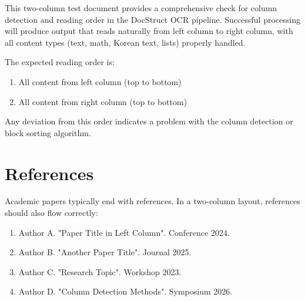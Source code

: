 \documentclass[10pt,twocolumn]{article}
\begin{document}
This two-column test document provides a comprehensive check for column detection and reading order in the DocStruct OCR pipeline. Successful processing will produce output that reads naturally from left column to right column, with all content types (text, math, Korean text, lists) properly handled.

The expected reading order is:
\begin{enumerate}
\item All content from left column (top to bottom)
\item All content from right column (top to bottom)
\end{enumerate}

Any deviation from this order indicates a problem with the column detection or block sorting algorithm.

\section{References}

Academic papers typically end with references. In a two-column layout, references should also flow correctly:

\begin{enumerate}
\item[{[1]}] Author A. "Paper Title in Left Column". Conference 2024.
\item[{[2]}] Author B. "Another Paper Title". Journal 2025.
\item[{[3]}] Author C. "Research Topic". Workshop 2023.
\item[{[4]}] Author D. "Column Detection Methods". Symposium 2026.
\end{enumerate}
\end{document}

